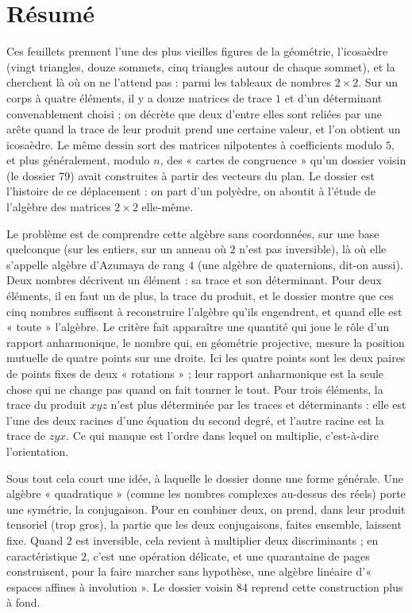 \documentclass[11pt,a4paper]{article}
\begin{document}
\section*{Résumé}

\begin{resume}
Ces feuillets prennent l'une des plus vieilles figures de la géométrie,
l'icosaèdre (vingt triangles, douze sommets, cinq triangles autour de chaque
sommet), et la cherchent là où on ne l'attend pas : parmi les tableaux de
nombres $2 \times 2$. Sur un corps à quatre éléments, il y a douze
matrices de trace $1$ et d'un déterminant convenablement choisi ; on décrète que deux d'entre
elles sont reliées par une arête quand la trace de leur produit prend une
certaine valeur, et l'on obtient un icosaèdre. Le même dessin sort des
matrices nilpotentes à coefficients modulo $5$, et plus généralement, modulo
$n$, des « cartes de congruence » qu'un dossier voisin (le dossier 79) avait
construites à partir des vecteurs du plan. Le dossier est l'histoire de ce
déplacement : on part d'un polyèdre, on aboutit à l'étude de l'algèbre des
matrices $2 \times 2$ elle-même.

Le problème est de comprendre cette algèbre sans coordonnées, sur une base
quelconque (sur les entiers, sur un anneau où $2$ n'est pas inversible), là
où elle s'appelle algèbre d'Azumaya de rang $4$ (une algèbre de quaternions,
dit-on aussi). Deux nombres décrivent un élément : sa trace et son
déterminant. Pour deux éléments, il en faut un de plus, la trace du produit, et
le dossier montre que ces cinq nombres suffisent à reconstruire l'algèbre
qu'ils engendrent, et quand elle est « toute » l'algèbre. Le critère fait
apparaître une quantité qui joue le rôle d'un rapport anharmonique, le
nombre qui, en géométrie projective, mesure la position mutuelle de quatre
points sur une droite. Ici les quatre points sont les deux paires de points
fixes de deux « rotations » ; leur rapport anharmonique est la seule chose
qui ne change pas quand on fait tourner le tout. Pour trois éléments, la trace
du produit $xyz$ n'est plus déterminée par les traces et déterminants : elle
est l'une des deux racines d'une équation du second degré, et l'autre racine
est la trace de $zyx$. Ce qui manque est l'ordre dans lequel on multiplie, c'est-à-dire
l'orientation.

Sous tout cela court une idée, à laquelle le dossier donne une forme
générale. Une algèbre « quadratique » (comme les nombres complexes au-dessus
des réels) porte une symétrie, la conjugaison. Pour en combiner deux, on
prend, dans leur produit tensoriel (trop gros), la partie que
les deux conjugaisons, faites ensemble, laissent fixe. Quand $2$ est
inversible, cela revient à multiplier deux
discriminants ; en caractéristique $2$, c'est une opération délicate, et une
quarantaine de pages construisent, pour la faire marcher sans hypothèse, une
algèbre linéaire d'« espaces affines à involution ». Le dossier voisin 84
reprend cette construction plus à fond.


\end{resume}
\end{document}
